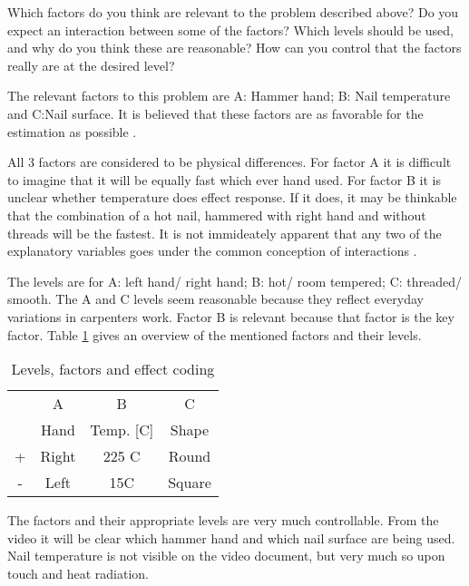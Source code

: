 Which factors do you think are relevant to the problem described above?
Do you expect an interaction between some of the factors?
Which levels should be used, and why do you think these are reasonable?
How can you control that the factors really are at the desired level?

The relevant factors to this problem are A: Hammer hand; B: Nail temperature and C:Nail surface. It is believed that these factors are as favorable for the estimation as possible \parencite[1]{tyssedal}.

All 3 factors are considered to be physical differences. For factor A it is difficult to imagine that it will be equally fast which ever hand used. For factor B it is unclear whether temperature does effect response. If it does, it may be thinkable that the combination of a hot nail, hammered with right hand and without threads will be the fastest. It is not immideately apparent that any two of the explanatory variables goes under the common conception of interactions \parencite{interactionswiki}. 

The levels are for A: left hand/ right hand; B: hot/ room tempered; C: threaded/ smooth. The A and C levels seem reasonable because they reflect everyday variations in carpenters work. Factor B is relevant because that factor is the key factor. Table \ref{tab:factors} gives an overview of the mentioned factors and their levels. 

\begin{table}[H]
    \centering
    \begin{tabular}{|c|c|c|c|}
        \hline
        & A  & B & C\\
        & Hand  & Temp. [C] & Shape \\
        \hline
         + & Right & 225 C & Round \\
         - & Left & 15C & Square \\
         \hline
    \end{tabular}
    \caption{Levels, factors and effect coding}
    \label{tab:factors}
\end{table}

The factors and their appropriate levels are very much controllable. From the video it will be clear which hammer hand and which nail surface are being used. Nail temperature is not visible on the video document, but very much so upon touch and heat radiation.